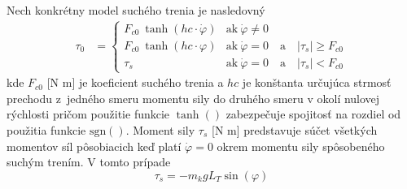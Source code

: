 \documentclass[a4paper, 10pt, ]{article}
\begin{document}
Nech konkrétny model suchého trenia je nasledovný
\begin{align}
    \tau_0 &= 
    \begin{cases} 
        F_{c0} \ \tanh(hc\cdot \dot \varphi) & \text{ak}   \ \dot \varphi \neq 0  \\
        F_{c0} \ \tanh(hc\cdot      \varphi) & \text{ak}   \ \dot \varphi = 0 \quad \text{a} \quad \left|\tau_s\right| \geq F_{c0} \\
        \tau_s &  \text{ak}  \ \dot \varphi = 0 \quad \text{a} \quad \left|\tau_s\right| < F_{c0}
    \end{cases}         
\end{align}
kde $F_{c0}$ [N m] je koeficient suchého trenia a $hc$ je konštanta určujúca strmosť prechodu z~jedného smeru momentu sily do druhého smeru v okolí nulovej rýchlosti pričom použitie funkcie $\tanh()$ zabezpečuje spojitosť na rozdiel od použitia funkcie $\text{sgn}()$. 
Moment sily $\tau_s$ [N m] predstavuje súčet všetkých momentov síl pôsobiacich keď platí $\dot \varphi = 0$ okrem momentu sily spôsobeného suchým trením. V tomto prípade
\begin{equation}
    \tau_s = - m_k g L_T \sin(\varphi)
\end{equation}
\end{document}
